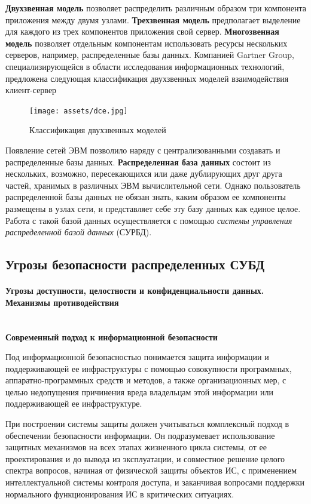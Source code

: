 \textbf{Двухзвенная модель} позволяет распределить различным образом три компонента приложения между двумя узлами.
\textbf{Трехзвенная модель} предполагает выделение для каждого из трех компонентов приложения свой сервер.
\textbf{Многозвенная модель} позволяет отдельным компонентам использовать ресурсы нескольких серверов, например,
распределенные базы данных. Компанией Gartner Group, специализирующейся в области исследования информационных технологий,
предложена следующая классификация двухзвенных моделей взаимодействия клиент-сервер \autocite{dce}
\begin{figure}[h!]
    \centering
    \texttt{[image: assets/dce.jpg]}
    \caption{Классификация двухзвенных моделей}
\end{figure}

Появление сетей ЭВМ позволило наряду с централизованными создавать и распределенные базы данных.
\textbf{Распределенная база данных} состоит из нескольких, возможно, пересекающихся или да­же дублирующих друг друга
частей, хранимых в различных ЭВМ вычислительной сети. Однако пользователь распределенной базы данных не обязан
знать, каким образом ее компоненты размещены в узлах сети, и представляет себе эту базу данных как единое
це­лое. Работа с такой базой данных осуществляется с помощью \textit{сис­темы управления распределенной базой данных} (СУРБД).
\\

\subsection{Угрозы безопасности распределенных СУБД}
\paragraph{Угрозы доступности, целостности и конфиденциальности данных. Механизмы противодействия} ~\\

\textbf{Современный подход к информационной безопасности}

Под информационной безопасностью понимается защита информации и поддерживающей ее инфраструктуры с помощью
совокупности программных, аппаратно-программных средств и методов, а также организационных мер, с целью недопущения
причинения вреда владельцам этой информации или поддерживающей ее инфраструктуре.

При построении системы защиты должен учитываться комплексный подход в обеспечении безопасности информации.
Он подразумевает использование защитных механизмов на всех этапах жизненного цикла системы, от ее проектирования
и до вывода из эксплуатации, и совместное решение целого спектра вопросов, начиная от физической защиты объектов ИС,
с применением интеллектуальной системы контроля доступа, и заканчивая вопросами поддержки нормального функционирования
ИС в критических ситуациях.

